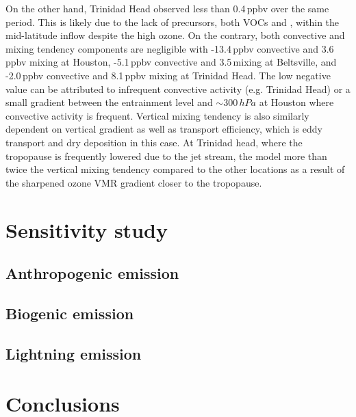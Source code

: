 On the other hand, Trinidad Head observed less than 0.4\,\unit{ppbv} over the same period. This is likely due to the lack of precursors,
both VOCs and , within the mid-latitude inflow despite the high ozone. On the contrary, both convective and mixing tendency
components are negligible with -13.4\,\unit{ppbv} convective and 3.6\,\unit{ppbv} mixing at Houston, -5.1\,\unit{ppbv} convective and
3.5\,\unit{mixing} at Beltsville, and -2.0\,\unit{ppbv} convective and 8.1\,\unit{ppbv} mixing at Trinidad Head. The low negative value can
be attributed to infrequent convective activity (e.g. Trinidad Head) or a small gradient between the entrainment level and $\sim300\,\unit{hPa}$
at Houston where convective activity is frequent. Vertical mixing tendency is also similarly dependent on vertical gradient as well as
transport efficiency, which is eddy transport and dry deposition in this case. At Trinidad head, where the tropopause is frequently
lowered due to the jet stream, the model more than twice the vertical mixing tendency compared to the other locations as a result of
the sharpened ozone VMR gradient closer to the tropopause.

\section{Sensitivity study}\label{sec:2006/sens}
\subsection{Anthropogenic emission}\label{ssec:2006/sens/anthrop}
\subsection{Biogenic emission}\label{ssec:2006/sens/bio}
\subsection{Lightning emission}\label{ssec:2006/sens/lnox}

\section{Conclusions}\label{sec:2006/conslusion}
